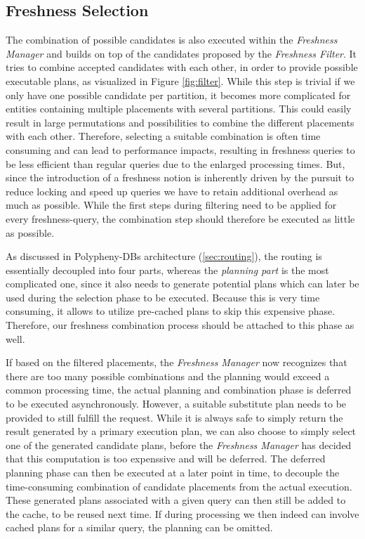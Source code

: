

\subsection{Freshness Selection}
\label{sec:fresh_select}

The combination of possible candidates is also executed within the \emph{Freshness Manager} and builds on top of the candidates proposed by the \emph{Freshness Filter}.
It tries to combine accepted candidates with each other, in order to provide possible executable plans, as visualized in Figure \ref{fig:filter}.
While this step is trivial if we only have one possible candidate per partition, it becomes more complicated for entities containing multiple placements 
with several partitions. This could easily result in large permutations and possibilities to combine the different placements with each other.
Therefore, selecting a suitable combination is often time consuming and can lead to performance impacts, 
resulting in freshness queries to be less efficient than regular queries due to the enlarged processing times. 
But, since the introduction of a freshness notion is inherently driven by the pursuit to reduce locking and speed up queries we have to 
retain additional overhead as much as possible. 
While the first steps during filtering need to be applied for every freshness-query, the combination step should therefore be executed as little as possible.

As discussed in Polypheny-DBs architecture (\ref{sec:routing}), the routing is essentially decoupled into four parts,
whereas the \emph{planning part} is the most complicated one, since it also needs to generate potential plans which can later be used during the selection phase 
to be executed. Because this is very time consuming, it allows to utilize pre-cached plans to skip this expensive phase.
Therefore, our freshness combination process should be attached to this phase as well.

If based on the filtered placements, the \emph{Freshness Manager} now recognizes that there are too many possible combinations and the planning would 
exceed a common processing time, the actual planning and combination phase is deferred to be executed asynchronously.
However, a suitable substitute plan needs to be provided to still fulfill the request.
While it is always safe to simply return the result generated by a primary execution plan, we can also choose to simply select one of the generated candidate plans, before
the \emph{Freshness Manager} has decided that this computation is too expenssive and will be deferred. 
The deferred planning phase can then be executed at a later point in time, to decouple the time-consuming combination of candidate placements from the actual execution.
These generated plans associated with a given query can then still be added to the cache, to be reused next time.
If during processing we then indeed can involve cached plans for a similar query, the planning can be omitted.

